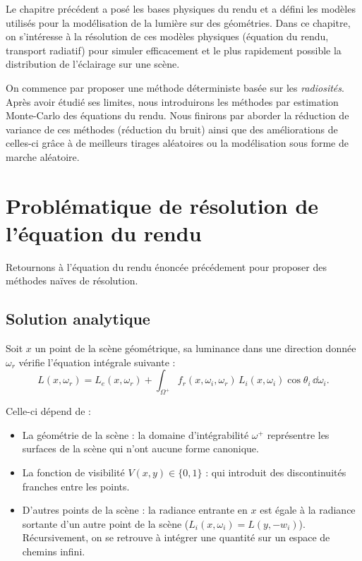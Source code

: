 \minitoc 


Le chapitre précédent a posé les bases physiques du rendu et a défini les modèles utilisés pour la modélisation de la lumière sur des géométries. 
Dans ce chapitre, on s'intéresse à la résolution de ces modèles physiques (équation du rendu, transport radiatif) pour simuler efficacement et le plus rapidement possible la distribution de l'éclairage sur une scène. 

On commence par proposer une méthode déterministe basée sur les \emph{radiosités}. Après avoir étudié ses limites, nous introduirons les méthodes par estimation Monte-Carlo des équations du rendu. Nous finirons par aborder la réduction de variance de ces méthodes (réduction du bruit) ainsi que des améliorations de celles-ci grâce à de meilleurs tirages aléatoires ou la modélisation sous forme de marche aléatoire. 


\section{Problématique de résolution de l'équation du rendu}

Retournons à l'équation du rendu énoncée précédement pour proposer des méthodes naïves de résolution. 

\subsection{Solution analytique}

Soit $x$ un point de la scène géométrique, sa luminance dans une direction donnée $ \omega_r$ vérifie l'équation intégrale suivante :
\begin{equation}
    L(x, \omega_r) = L_e(x, \omega_r) + \int_{\Omega^+} f_r(x, \omega_i, \omega_r) \, L_i(x, \omega_i) \cos\theta_i \, \dd\omega_i. 
\end{equation}

Celle-ci dépend de : 
\begin{itemize}
    \item La géométrie de la scène : la domaine d'intégrabilité $ \omega^+$ représentre les surfaces de la scène qui n'ont aucune forme canonique. 
    \item La fonction de visibilité $ V(x, y) \in \{0,1\}$ : qui introduit des discontinuités franches entre les points. 
    \item D'autres points de la scène : la radiance entrante en $x$ est égale à la radiance sortante d'un autre point de la scène ($L_i(x, \omega_i) = L(y, - w_i)$). Récursivement, on se retrouve à intégrer une quantité sur un espace de chemins infini. 
\end{itemize}

